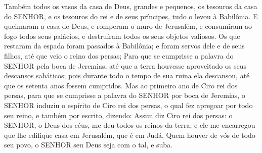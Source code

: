 {Também todos os vasos da casa de Deus, grandes e pequenos, os tesouros da casa do SENHOR, e os tesouros do rei e de seus príncipes, tudo o levou à Babilônia.
E queimaram a casa de Deus, e romperam o muro de Jerusalém, e consumiram ao fogo todos seus palácios, e destruíram todos os seus objetos valiosos.
Os que restaram da espada foram passados à Babilônia; e foram servos dele e de seus filhos, até que veio o reino dos persas;
Para que se cumprisse a palavra do SENHOR pela boca de Jeremias, até que a terra houvesse aproveitado os seus descansos sabáticos; pois durante todo o tempo de sua ruina ela descansou, até que os setenta anos fossem cumpridos.
Mas ao primeiro ano de Ciro rei dos persas, para que se cumprisse a palavra do SENHOR por boca de Jeremias, o SENHOR induziu o espírito de Ciro rei dos persas, o qual fez apregoar por todo seu reino, e também por escrito, dizendo:
Assim diz Ciro rei dos persas: o SENHOR, o Deus dos céus, me deu todos os reinos da terra; e ele me encarregou que lhe edifique casa em Jerusalém, que é em Judá. Quem houver de vós de todo seu povo, o SENHOR seu Deus seja com o tal, e suba.\par }